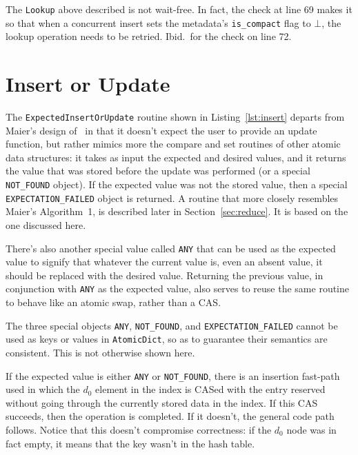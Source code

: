 The \texttt{Lookup} above described is not wait-free.
In fact, the check at line 69 makes it so that when a concurrent insert sets the metadata's \texttt{{is\_compact}} flag to $\bot$, the lookup operation needs to be retried.
Ibid.\ for the check on line 72.




\section{Insert or Update}\label{sec:insert-or-update}

The \texttt{ExpectedInsertOrUpdate} routine shown in Listing~\ref{lst:insert} departs from Maier's design of~\cite[Algorithm~1]{maier} in that it doesn't expect the user to provide an update function, but rather mimics more the compare and set routines of other atomic data structures: it takes as input the expected and desired values, and it returns the value that was stored before the update was performed (or a special \texttt{{NOT\_FOUND}} object).
If the expected value was not the stored value, then a special \texttt{{EXPECTATION\_FAILED}} object is returned.
A routine that more closely resembles Maier's Algorithm~1, is described later in Section~\ref{sec:reduce}.
It is based on the one discussed here.

There's also another special value called \texttt{ANY} that can be used as the expected value to signify that whatever the current value is, even an absent value, it should be replaced with the desired value.
Returning the previous value, in conjunction with \texttt{ANY} as the expected value, also serves to reuse the same routine to behave like an atomic swap, rather than a CAS\@.

The three special objects \texttt{{ANY}}, \texttt{{NOT\_FOUND}}, and \texttt{{EXPECTATION\_FAILED}} cannot be used as keys or values in \texttt{AtomicDict}, so as to guarantee their semantics are consistent.
This is not otherwise shown here.

If the expected value is either \texttt{{ANY}} or \texttt{{NOT\_FOUND}}, there is an insertion fast-path used in which the $d_0$ element in the index is CASed with the entry reserved without going through the currently stored data in the index.
If this CAS succeeds, then the operation is completed.
If it doesn't, the general code path follows.
Notice that this doesn't compromise correctness: if the $d_0$ node was in fact empty, it means that the key wasn't in the hash table.

